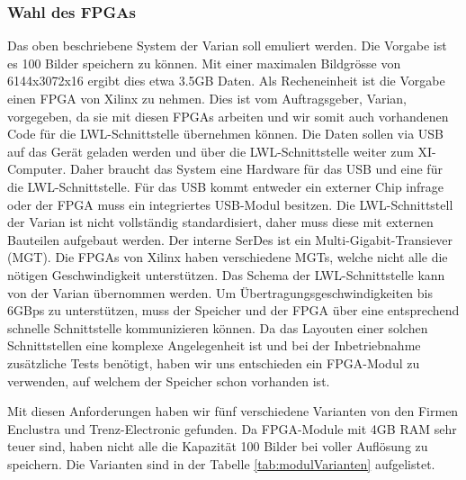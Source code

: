 \subsubsection*{Wahl des FPGAs}
Das oben beschriebene System der Varian soll emuliert werden. Die Vorgabe ist es 100 Bilder speichern zu können. Mit einer maximalen Bildgrösse von 6144x3072x16 ergibt dies etwa 3.5GB Daten. Als Recheneinheit ist die Vorgabe einen FPGA von Xilinx zu nehmen. Dies ist vom Auftragsgeber, Varian, vorgegeben, da sie mit diesen FPGAs arbeiten und wir somit auch vorhandenen Code für die LWL-Schnittstelle übernehmen können. Die Daten sollen via USB auf das Gerät geladen werden und über die LWL-Schnittstelle weiter zum XI-Computer. Daher braucht das System eine Hardware für das USB und eine für die LWL-Schnittstelle. Für das USB kommt entweder ein externer Chip infrage oder der FPGA muss ein integriertes USB-Modul besitzen. Die LWL-Schnittstell der Varian ist nicht vollständig standardisiert, daher muss diese mit externen Bauteilen aufgebaut werden. Der interne SerDes ist ein Multi-Gigabit-Transiever (MGT). Die FPGAs von Xilinx haben verschiedene MGTs, welche nicht alle die nötigen Geschwindigkeit unterstützen. \cite{mgt} Das Schema der LWL-Schnittstelle kann von der Varian übernommen werden. Um Übertragungsgeschwindigkeiten bis 6GBps zu unterstützen, muss der Speicher und der FPGA über eine entsprechend schnelle Schnittstelle kommunizieren können. Da das Layouten einer solchen Schnittstellen eine komplexe Angelegenheit ist und bei der Inbetriebnahme zusätzliche Tests benötigt, haben wir uns entschieden ein FPGA-Modul zu verwenden, auf welchem der Speicher schon vorhanden ist. 

Mit diesen Anforderungen haben wir fünf verschiedene Varianten von den Firmen Enclustra und Trenz-Electronic gefunden. Da FPGA-Module mit 4GB RAM sehr teuer sind, haben nicht alle die Kapazität 100 Bilder bei voller Auflösung zu speichern. Die Varianten sind in der Tabelle \ref{tab:modulVarianten} aufgelistet.

